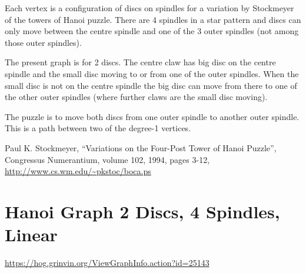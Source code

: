 \documentclass{article}
\begin{document}
Each vertex is a configuration of discs on spindles for a variation by
Stockmeyer of the towers of Hanoi puzzle.  There are 4 spindles in a
star pattern and discs can only move between the centre spindle and
one of the 3 outer spindles (not among those outer spindles).

The present graph is for 2 discs.  The centre claw has big disc on the
centre spindle and the small disc moving to or from one of the outer
spindles.  When the small disc is not on the centre spindle the big
disc can move from there to one of the other outer spindles (where
further claws are the small disc moving).

The puzzle is to move both discs from one outer spindle to another outer
spindle.  This is a path between two of the degree\hyp{}1 vertices.

Paul K. Stockmeyer, ``Variations on the Four-Post Tower of Hanoi
Puzzle'', Congressus Numerantium, volume 102, 1994, pages 3-12,
\url{http://www.cs.wm.edu/~pkstoc/boca.ps}


\section{Hanoi Graph 2 Discs, 4 Spindles, Linear}

\url{https://hog.grinvin.org/ViewGraphInfo.action?id=25143}


\begin{center}
\end{center}
\end{document}
